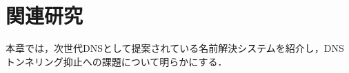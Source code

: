 \section{関連研究}
\label{sec:related-works}
本章では，次世代DNSとして提案されている名前解決システムを紹介し，DNSトンネリング抑止への課題について明らかにする．

